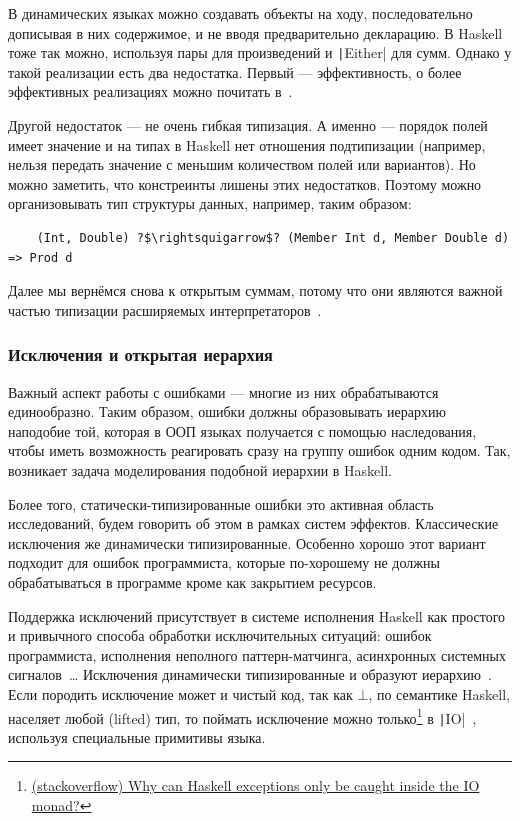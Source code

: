 В динамических языках можно создавать объекты на ходу, последовательно дописывая в них содержимое, и не вводя предварительно декларацию.
В Haskell тоже так можно, используя пары для произведений и \texttt|Either| для сумм.
Однако у такой реализации есть два недостатка.
Первый --- эффективность, о более эффективных реализациях можно почитать в~\cite[глава 11]{maguire-types}.

Другой недостаток --- не очень гибкая типизация.
А именно --- порядок полей имеет значение и на типах в Haskell нет отношения подтипизации (например, нельзя передать значение с меньшим количеством полей или вариантов).
Но можно заметить, что констреинты лишены этих недостатков.
Поэтому можно организовывать тип структуры данных, например, таким образом:
\begin{verbatim}
    (Int, Double) ?$\rightsquigarrow$? (Member Int d, Member Double d) => Prod d
\end{verbatim}

Далее мы вернёмся снова к открытым суммам, потому что они являются важной частью типизации расширяемых интерпретаторов~\cite{swierstra2008data}.

\subsubsection{Исключения и открытая иерархия}

Важный аспект работы с ошибками --- многие из них обрабатываются единообразно.
Таким образом, ошибки должны образовывать иерархию наподобие той, которая в ООП языках получается с помощью наследования, чтобы иметь возможность реагировать сразу на группу ошибок одним кодом.
Так, возникает задача моделирования подобной иерархии в Haskell.

Более того, статически-типизированные ошибки это активная область исследований, будем говорить об этом в рамках систем эффектов.
Классические исключения же динамически типизированные.
Особенно хорошо этот вариант подходит для ошибок программиста, которые по-хорошему не должны обрабатываться в программе кроме как закрытием ресурсов.

Поддержка исключений присутствует в системе исполнения Haskell как простого и привычного способа обработки исключительных ситуаций: ошибок программиста, исполнения неполного паттерн-матчинга, асинхронных системных сигналов~\cite{marlow2001asynchronous}\ldots
Исключения динамически типизированные и образуют иерархию~\cite{marlow2006extensible}.
Если породить исключение может и чистый код, так как $\bot$, по семантике Haskell, населяет любой (lifted) тип, то поймать исключение можно только\footnote{\href{https://stackoverflow.com/questions/3642793/why-can-haskell-exceptions-only-be-caught-inside-the-io-monad}{(stackoverflow) Why can Haskell exceptions only be caught inside the IO monad?}} в \texttt|IO|~\cite{jones2001tackling}, используя специальные примитивы языка.

